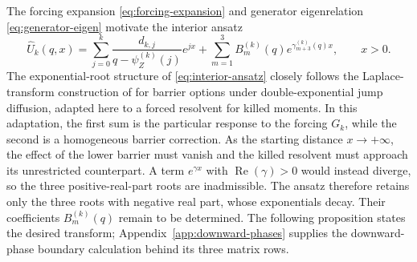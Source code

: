 \documentclass[11pt]{article}
\newcommand{\Rea}{\operatorname{Re}}
\theoremstyle{plain}
\theoremstyle{definition}
\theoremstyle{remark}
\begin{document}
The forcing expansion \eqref{eq:forcing-expansion} and generator eigenrelation
\eqref{eq:generator-eigen} motivate the interior ansatz
\begin{equation}\label{eq:interior-ansatz}
\widehat U_k(q,x)
=\sum_{j=0}^{k}\frac{d_{k,j}}{q-\psi_Z^{(k)}(j)}e^{jx}
+\sum_{m=1}^{3}B_m^{(k)}(q)e^{\gamma_{m+3}^{(k)}(q)x},
\qquad x>0.
\end{equation}
The exponential-root structure of \eqref{eq:interior-ansatz} closely follows the
Laplace-transform construction of \citet{Sepp2004} for barrier options under
double-exponential jump diffusion, adapted here to a forced resolvent for killed moments.
In this adaptation, the first sum is the particular response to the forcing $G_k$, while the
second is a homogeneous barrier correction. As the starting distance $x\to+\infty$, the
effect of the lower barrier must vanish and the killed resolvent must approach its
unrestricted counterpart. A term
$e^{\gamma x}$ with $\Rea(\gamma)>0$ would instead diverge, so the three positive-real-part
roots are inadmissible. The ansatz therefore retains only the three roots with negative real
part, whose exponentials decay. Their coefficients $B_m^{(k)}(q)$ remain to be determined.
The following proposition states the desired transform; Appendix~\ref{app:downward-phases}
supplies the downward-phase boundary calculation behind its three matrix rows.
\end{document}
